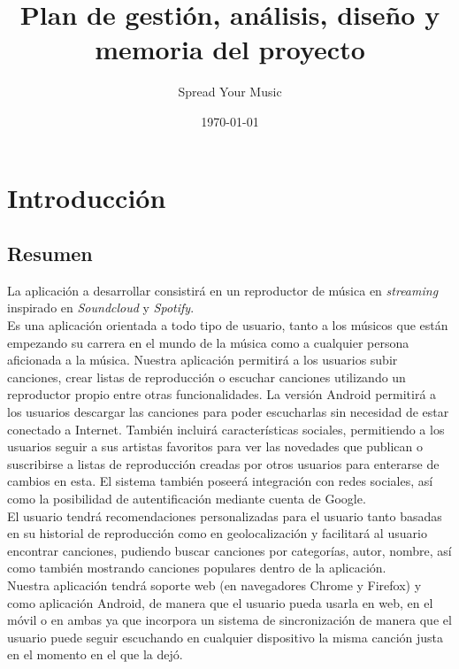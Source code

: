 \documentclass[12pt]{article}%
\begin{document}
\title{Plan de gesti\'on, an\'alisis, dise\~no y memoria del proyecto}
\author{Spread Your Music}
\date{\today}
\maketitle

\tableofcontents

\newpage


\section{Introducci\'on}

\subsection{Resumen}

La aplicaci\'on a desarrollar consistir\'a en un reproductor de m\'usica en \textit{streaming} inspirado en \textit{Soundcloud} y \textit{Spotify}.\\ 

Es una aplicaci\'on orientada a todo tipo de usuario, tanto a los m\'usicos que est\'an empezando su carrera en el mundo de la m\'usica como a cualquier persona aficionada a la m\'usica. Nuestra aplicaci\'on permitir\'a a los usuarios subir canciones, crear listas de reproducci\'on o escuchar canciones utilizando un reproductor propio entre otras funcionalidades. La versi\'on Android permitir\'a a los usuarios descargar las canciones para poder escucharlas sin necesidad de estar conectado a Internet. También incluir\'a caracter\'isticas sociales, permitiendo a los usuarios seguir a sus artistas favoritos para ver las novedades que publican o suscribirse a listas de reproducci\'on creadas por otros usuarios para enterarse de cambios en esta. El sistema también poseer\'a integraci\'on con redes sociales, as\'i como la posibilidad de autentificaci\'on mediante cuenta de Google.\\

El usuario tendr\'a recomendaciones personalizadas para el usuario tanto basadas en su historial de reproducci\'on como en geolocalizaci\'on y facilitar\'a al usuario encontrar canciones, pudiendo buscar canciones por categor\'ias, autor, nombre, as\'i como también mostrando canciones populares dentro de la aplicaci\'on.\\

Nuestra aplicaci\'on tendr\'a soporte web (en navegadores Chrome y Firefox) y como aplicaci\'on Android, de manera que el usuario pueda usarla en web, en el m\'ovil o en ambas ya que incorpora un sistema de sincronizaci\'on de manera que el usuario puede seguir escuchando en cualquier dispositivo la misma canci\'on justa en el momento en el que la dej\'o. \\
\end{document}
